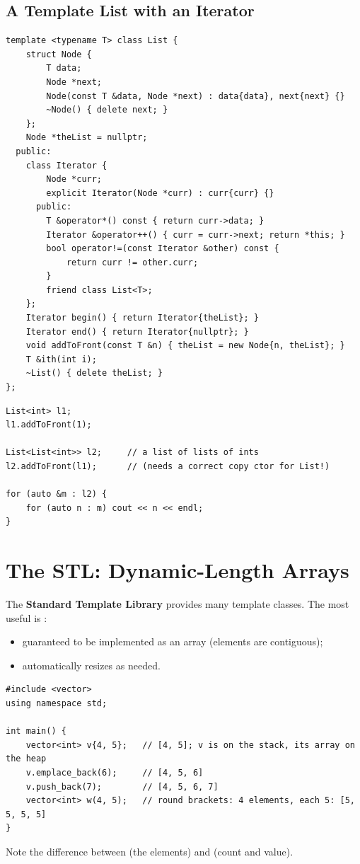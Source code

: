 \subsection{A Template List with an Iterator}
\begin{lstlisting}[style=cpp]
template <typename T> class List {
    struct Node {
        T data;
        Node *next;
        Node(const T &data, Node *next) : data{data}, next{next} {}
        ~Node() { delete next; }
    };
    Node *theList = nullptr;
  public:
    class Iterator {
        Node *curr;
        explicit Iterator(Node *curr) : curr{curr} {}
      public:
        T &operator*() const { return curr->data; }
        Iterator &operator++() { curr = curr->next; return *this; }
        bool operator!=(const Iterator &other) const {
            return curr != other.curr;
        }
        friend class List<T>;
    };
    Iterator begin() { return Iterator{theList}; }
    Iterator end() { return Iterator{nullptr}; }
    void addToFront(const T &n) { theList = new Node{n, theList}; }
    T &ith(int i);
    ~List() { delete theList; }
};
\end{lstlisting}
\begin{lstlisting}[style=cpp]
List<int> l1;
l1.addToFront(1);

List<List<int>> l2;     // a list of lists of ints
l2.addToFront(l1);      // (needs a correct copy ctor for List!)

for (auto &m : l2) {
    for (auto n : m) cout << n << endl;
}
\end{lstlisting}

\section{The STL: Dynamic-Length Arrays}
The \textbf{Standard Template Library} provides many template classes. The most
useful is :
\begin{itemize}
  \item guaranteed to be implemented as an array (elements are contiguous);
  \item automatically resizes as needed.
\end{itemize}
\begin{lstlisting}[style=cpp]
#include <vector>
using namespace std;

int main() {
    vector<int> v{4, 5};   // [4, 5]; v is on the stack, its array on the heap
    v.emplace_back(6);     // [4, 5, 6]
    v.push_back(7);        // [4, 5, 6, 7]
    vector<int> w(4, 5);   // round brackets: 4 elements, each 5: [5, 5, 5, 5]
}
\end{lstlisting}
Note the difference between  (the elements) and 
(count and value).

